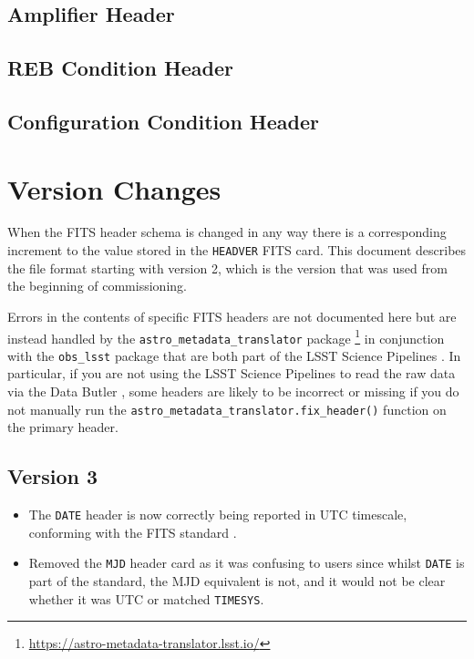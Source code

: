 \documentclass[OPS,lsstdraft,authoryear,toc]{lsstdoc}
\begin{document}
\subsection{Amplifier Header}



\subsection{REB Condition Header}



\subsection{Configuration Condition Header}



\appendix

\section{Version Changes}

When the FITS header schema is changed in any way there is a corresponding increment to the value stored in the \texttt{HEADVER} FITS card.
This document describes the file format starting with version 2, which is the version that was used from the beginning of commissioning.

Errors in the contents of specific FITS headers are not documented here but are instead handled by the \texttt{astro\_metadata\_translator} package \footnote{\url{https://astro-metadata-translator.lsst.io/}} in conjunction with the \texttt{obs\_lsst} package that are both part of the LSST Science Pipelines .
In particular, if you are not using the LSST Science Pipelines to read the raw data via the Data Butler \citep{2022SPIE12189E..11J}, some headers are likely to be incorrect or missing if you do not manually run the \texttt{astro\_metadata\_translator.fix\_header()} function on the primary header.

\subsection{Version 3}

\begin{itemize}
\item The \texttt{DATE} header is now correctly being reported in UTC timescale, conforming with the FITS standard \citep{2010A&A...524A..42P}.
\item Removed the \texttt{MJD} header card as it was confusing to users since whilst \texttt{DATE} is part of the standard, the MJD equivalent is not, and it would not be clear whether it was UTC or matched \texttt{TIMESYS}.
\end{itemize}
\end{document}

